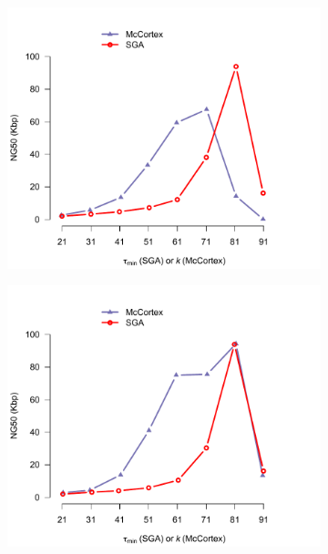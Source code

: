 \documentclass[a4paper]{article}
\begin{document}
\begin{figure}[H]
\centering
\begin{subfigure}{.45\textwidth}
\centering
\includegraphics[width=1\linewidth]{../links-vs-sga-ng50.pdf}
\end{subfigure}
\begin{subfigure}{.45\textwidth}
\centering
\includegraphics[width=1\linewidth]{../corr-links-vs-sga-ng50.pdf}
\end{subfigure}
\begin{subfigure}{.45\textwidth}

\end{subfigure}
\end{figure}
\end{document}
